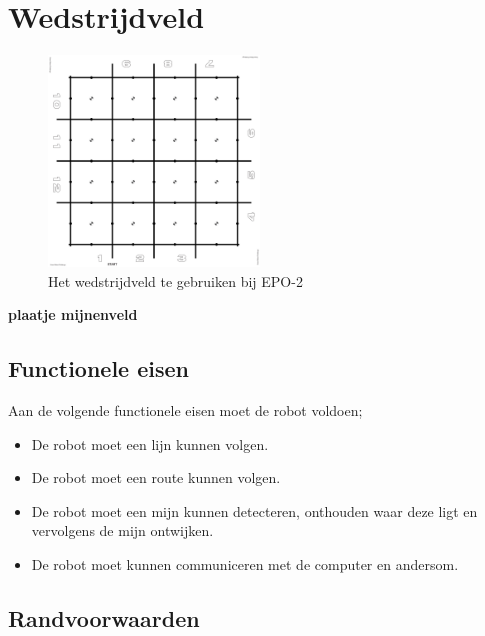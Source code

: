\documentclass{report}
\begin{document}
\section{Wedstrijdveld}
\label{sec:field}

\begin{figure}[H]
	\centering
	\includegraphics[width=0.5\textwidth]{competitionField2440x2440-rc.pdf}
	\caption{Het wedstrijdveld te gebruiken bij EPO-2}
	\label{fig:field}
\end{figure}

\textbf{plaatje mijnenveld}

\subsection{Functionele eisen}

Aan de volgende functionele eisen moet de robot voldoen;

\begin{itemize}

\item
De robot moet een lijn kunnen volgen. 

\item 
De robot moet een route kunnen volgen.

\item
De robot moet een mijn kunnen detecteren, onthouden waar deze ligt en vervolgens de mijn ontwijken.

\item 
De robot moet kunnen communiceren met de computer en andersom.

\end{itemize}


\subsection{Randvoorwaarden}
\end{document}
